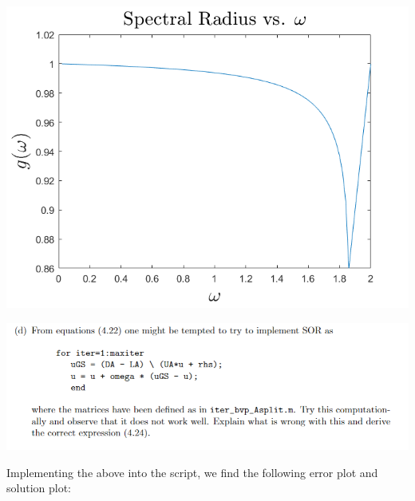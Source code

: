 \documentclass{article}
\begin{document}
\begin{center}
    \includegraphics[scale = 0.6]{spectralRadiusvsOmega.png}
\end{center}


\includegraphics[scale = 0.8]{ex4.1d.PNG}
\newline

Implementing the above into the script, we find the following error plot and solution plot:
\end{document}
